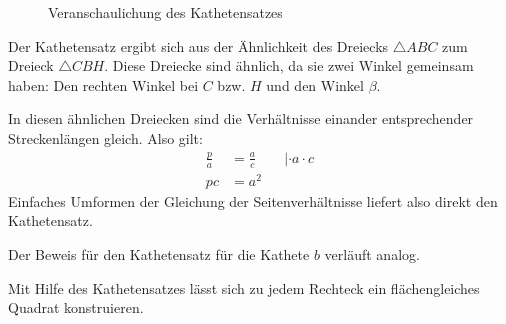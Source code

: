 \begin{ssatz}[Kathetensatz]
\begin{figure}
\begin{center}

\end{center}
\caption{Veranschaulichung des Kathetensatzes}
\end{figure}
\end{ssatz}

\begin{bew}
 Der Kathetensatz ergibt sich aus der Ähnlichkeit des Dreiecks \(\triangle ABC\) zum Dreieck \(\triangle CBH\). Diese Dreiecke sind ähnlich, da sie zwei Winkel gemeinsam haben: Den rechten Winkel bei \(C\) bzw. \(H\) und den Winkel \(\beta\).
 
 In diesen ähnlichen Dreiecken sind die Verhältnisse einander entsprechender Streckenlängen gleich. Also gilt:
 \begin{align*}
  \frac{p}{a} &= \frac{a}{c} && |\cdot a \cdot c \\
  pc &= a^2
 \end{align*}
 Einfaches Umformen der Gleichung der Seitenverhältnisse liefert also direkt den Kathetensatz.
\end{bew}

Der Beweis für den Kathetensatz für die Kathete \(b\) verläuft analog.

Mit Hilfe des Kathetensatzes lässt sich zu jedem Rechteck ein flächengleiches Quadrat konstruieren.

